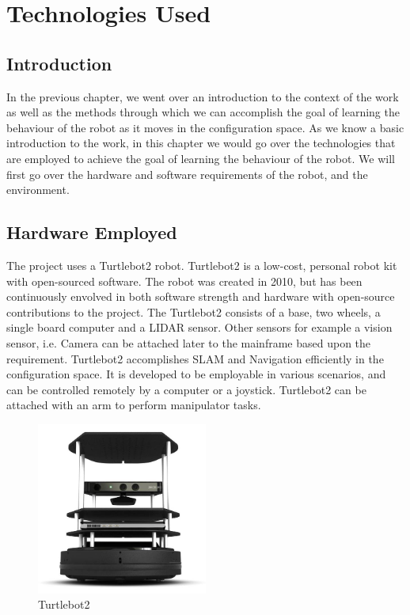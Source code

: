 
\chapter{Technologies Used} %

\label{Chapter2} %

\section{Introduction}
In the previous chapter, we went over an introduction to the context of the work as well as the methods through which we can accomplish the goal of learning the behaviour of the robot as it moves in the configuration space.
As we know a basic introduction to the work,  in this chapter we would go over the technologies that are employed to achieve the goal of learning the behaviour of the robot. We will first go over the hardware and software requirements of the robot, and the environment.
\section{Hardware Employed}
The project uses a Turtlebot2 \cite{t2} robot. Turtlebot2 is a low-cost, personal robot kit with open-sourced software. The robot was created in 2010, but has been continuously envolved in both 
software strength and hardware with open-source contributions to the project. The Turtlebot2 consists of a base, two wheels, a single board computer and a LIDAR sensor. Other sensors for example a vision sensor, i.e. Camera can be attached later to the mainframe based upon the requirement.
Turtlebot2 accomplishes SLAM and Navigation efficiently in the configuration space. It is developed to be employable in various scenarios, and can be controlled remotely by a computer or a joystick. 
Turtlebot2 can be attached with an arm to perform manipulator tasks.

\begin{figure}[th]
    \centering
    \includegraphics[width=0.5\textwidth]{Figures/turtlebot2.jpg}
    \decoRule
    \caption[]{Turtlebot2}
    \label{fig:Turtlebot2}
    \end{figure}

